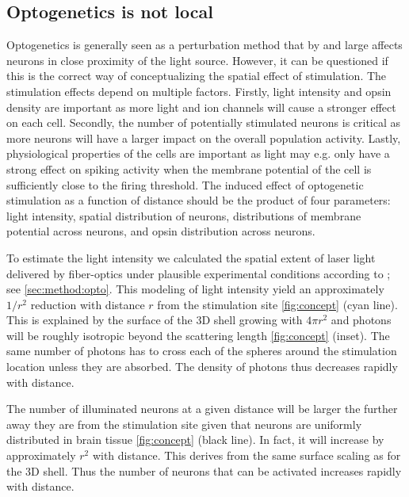 \documentclass[11pt]{article}
\begin{document}
\subsection{Optogenetics is not local}
Optogenetics is generally seen as a perturbation method that by and large affects neurons in close proximity of the light source. However, it can be questioned if this is the correct way of conceptualizing the spatial effect of stimulation. The stimulation effects depend on multiple factors. Firstly, light intensity and opsin density are important as more light and ion channels will cause a stronger effect on each cell. Secondly, the number of potentially stimulated neurons is critical as more neurons will have a larger impact on the overall population activity. Lastly, physiological properties of the cells are important as light may e.g. only have a strong effect on spiking activity when the membrane potential of the cell is sufficiently close to the firing threshold. The induced effect of optogenetic stimulation as a function of distance should be the product of four parameters:  light intensity, spatial distribution of neurons, distributions of membrane potential across neurons, and opsin distribution across neurons.

To estimate the light intensity we calculated the spatial extent of laser light delivered by fiber-optics under plausible experimental conditions according to \cite{Aravanis2007}; see \cref{sec:method:opto}. This modeling of light intensity yield an approximately $ 1/r^2 $ reduction with distance $ r $ from the stimulation site \cref{fig:concept} (cyan line). This is explained by the surface of the 3D shell growing with $4\pi r^2$ and photons will be roughly isotropic beyond the scattering length \cref{fig:concept} (inset). The same number of photons has to cross each of the spheres around the stimulation location unless they are absorbed. The density of photons thus decreases rapidly with distance.

The number of illuminated neurons at a given distance will be larger the further away they are from the stimulation site given that neurons are uniformly distributed in brain tissue \cref{fig:concept} (black line). In fact, it will increase by approximately $ r^2 $ with distance. This derives from the same surface scaling as for the 3D shell. Thus the number of neurons that can be activated increases rapidly with distance.
\end{document}
